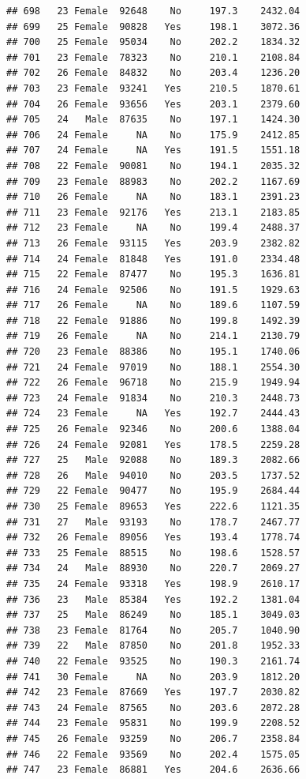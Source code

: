 \documentclass[12pt,]{krantz}
\theoremstyle{definition}
\theoremstyle{definition}
\theoremstyle{remark}
\begin{document}
\begin{verbatim}
## 698   23 Female  92648    No     197.3    2432.04
## 699   25 Female  90828   Yes     198.1    3072.36
## 700   25 Female  95034    No     202.2    1834.32
## 701   23 Female  78323    No     210.1    2108.84
## 702   26 Female  84832    No     203.4    1236.20
## 703   23 Female  93241   Yes     210.5    1870.61
## 704   26 Female  93656   Yes     203.1    2379.60
## 705   24   Male  87635    No     197.1    1424.30
## 706   24 Female     NA    No     175.9    2412.85
## 707   24 Female     NA   Yes     191.5    1551.18
## 708   22 Female  90081    No     194.1    2035.32
## 709   23 Female  88983    No     202.2    1167.69
## 710   26 Female     NA    No     183.1    2391.23
## 711   23 Female  92176   Yes     213.1    2183.85
## 712   23 Female     NA    No     199.4    2488.37
## 713   26 Female  93115   Yes     203.9    2382.82
## 714   24 Female  81848   Yes     191.0    2334.48
## 715   22 Female  87477    No     195.3    1636.81
## 716   24 Female  92506    No     191.5    1929.63
## 717   26 Female     NA    No     189.6    1107.59
## 718   22 Female  91886    No     199.8    1492.39
## 719   26 Female     NA    No     214.1    2130.79
## 720   23 Female  88386    No     195.1    1740.06
## 721   24 Female  97019    No     188.1    2554.30
## 722   26 Female  96718    No     215.9    1949.94
## 723   24 Female  91834    No     210.3    2448.73
## 724   23 Female     NA   Yes     192.7    2444.43
## 725   26 Female  92346    No     200.6    1388.04
## 726   24 Female  92081   Yes     178.5    2259.28
## 727   25   Male  92088    No     189.3    2082.66
## 728   26   Male  94010    No     203.5    1737.52
## 729   22 Female  90477    No     195.9    2684.44
## 730   25 Female  89653   Yes     222.6    1121.35
## 731   27   Male  93193    No     178.7    2467.77
## 732   26 Female  89056   Yes     193.4    1778.74
## 733   25 Female  88515    No     198.6    1528.57
## 734   24   Male  88930    No     220.7    2069.27
## 735   24 Female  93318   Yes     198.9    2610.17
## 736   23   Male  85384   Yes     192.2    1381.04
## 737   25   Male  86249    No     185.1    3049.03
## 738   23 Female  81764    No     205.7    1040.90
## 739   22   Male  87850    No     201.8    1952.33
## 740   22 Female  93525    No     190.3    2161.74
## 741   30 Female     NA    No     203.9    1812.20
## 742   23 Female  87669   Yes     197.7    2030.82
## 743   24 Female  87565    No     203.6    2072.28
## 744   23 Female  95831    No     199.9    2208.52
## 745   26 Female  93259    No     206.7    2358.84
## 746   22 Female  93569    No     202.4    1575.05
## 747   23 Female  86881   Yes     204.6    2636.66

\end{verbatim}
\end{document}
